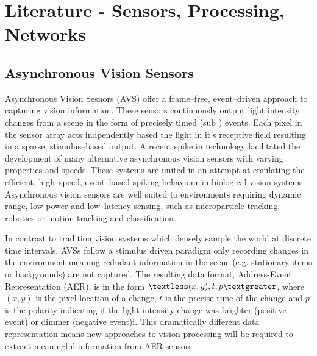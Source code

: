 \chapter{Literature - Sensors, Processing, Networks}


\section{Asynchronous Vision Sensors}  %
Asynchronous Vision Sesnors (AVS) offer a frame--free, event--driven approach to capturing vision information\cite{delbruck2010activity}. 
These sensors continuously output light intensity changes from a scene in the form of precisely timed (sub \ms) events. 
Each pixel in the sensor array acts indpendently based the light in it's receptive field resulting in a sparse, stimulus--based output. 
A recent spike in technology facilitated the development of many alternative asynchronous vision sensors with varying properties and speeds\cite{delbruck2014research}.
These systems are united in an attempt at emulating the efficient, high--speed, event--based spiking behaviour in biological vision systems\cite{delbruck2010activity}.
Asynchronous vision sensors are well suited to environments requiring dynamic range, low-power and low--latency sensing, such as microparticle tracking\cite{ni2012asynchronous}, robotics\cite{roboGoalie2013} or motion tracking and classification\cite{Lee2014, reverter2015neuromorphic}.

In contrast to tradition vision systems which densely sample the world at discrete time intervals, AVSs follow a stimulus driven paradigm only recording changes in the environment meaning redudant information in the scene (e.g. stationary items or backgrounds) are not captured.  
The resulting data format, Address-Event Representation (AER)\cite{mahowald1992vlsi}, is in the form $\textless (x, y), t, p \textgreater$, where $(x, y)$ is the pixel location of a change, $t$ is the precise time of the change and $p$ is the polarity indicating if the light intensity change was brighter (positive event) or dimmer (negative event)i\cite{delbruck2010activity}. 
This dramatically different data representation means new approaches to vision processing will be required to extract meaningful information from AER sensors\cite{akolkar2015can}. 


